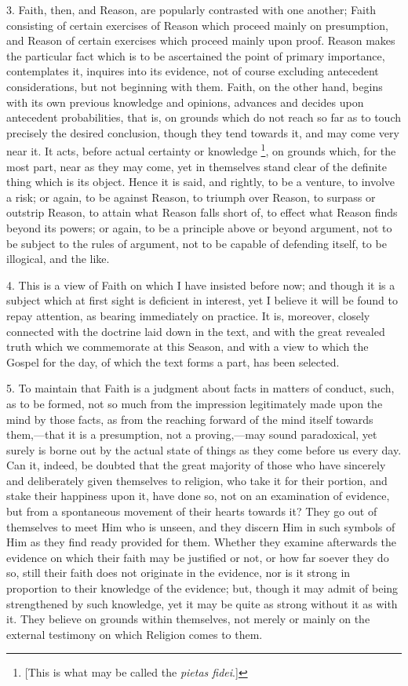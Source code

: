 3. Faith, then, and Reason, are popularly contrasted with one
another; Faith consisting of certain exercises of Reason which proceed
mainly on presumption, and Reason of certain exercises which proceed
mainly upon proof. Reason makes the particular fact which is to be
ascertained the point of primary importance, contemplates it, inquires
into its evidence, not of course excluding antecedent considerations,
but not beginning with them. Faith, on the other hand, begins with its
own previous knowledge and opinions, advances and decides upon
antecedent probabilities, that is, on grounds which do not reach so
far as to touch precisely the desired conclusion, though they tend
towards it, and may come very near it. It acts, before actual
certainty or knowledge \footnote{[This is what may be called the \emph{pietas fidei}.]},
on grounds which, for the most part, near as they may come, yet in
themselves stand clear of the definite thing which is its object.
Hence it is said, and rightly, to be a venture, to involve a risk; or
again, to be against Reason, to triumph over Reason, to surpass or
outstrip Reason, to attain what Reason falls short of, to effect what
Reason finds beyond its powers; or again, to be a principle above or
beyond argument, not to be subject to the rules of argument, not to be
capable of defending itself, to be illogical, and the like.

4. This is a view of Faith on which I have insisted before now; and
though it is a subject which at first sight is deficient in interest,
yet I believe it will be found to repay attention, as bearing
immediately on practice. It is, moreover, closely connected with the
doctrine laid down in the text, and with the great revealed truth
which we commemorate at this Season, and with a view to which the
Gospel for the day, of which the text forms a part, has been selected.

5. To maintain that Faith is a judgment about facts in matters of
conduct, such, as to be formed, not so much from the impression
legitimately made upon the mind by those facts, as from the reaching
forward of the mind itself towards them,—that it is a presumption,
not a proving,—may sound paradoxical, yet surely is borne out by the
actual state of things as they come before us every day. Can it,
indeed, be doubted that the great majority of those who have sincerely
and deliberately given themselves to religion, who take it for their
portion, and stake their happiness upon it, have done so, not on an
examination of evidence, but from a spontaneous movement of their
hearts towards it? They go out of themselves to meet Him who is
unseen, and they discern Him in such symbols of Him as they find ready
provided for them. Whether they examine afterwards the evidence on
which their faith may be justified or not, or how far soever they do
so, still their faith does not originate in the evidence, nor is it
strong in proportion to their knowledge of the evidence; but, though
it may admit of being strengthened by such knowledge, yet it may be
quite as strong without it as with it. They believe on grounds within
themselves, not merely or mainly on the external testimony on which
Religion comes to them.

